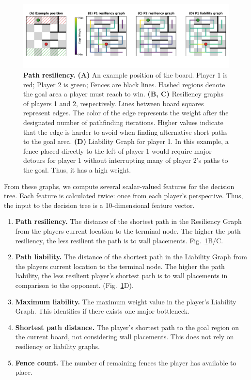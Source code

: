 \documentclass[10pt]{article}
\begin{document}
\begin{figure}[H]
    \centering
    \includegraphics[width=\linewidth]{path_figure.png}
    \caption{\textbf{Path resiliency.} \textbf{(A)} An example position of the board. Player 1 is red; Player 2 is green; Fences are black lines. Hashed regions denote the goal area a player must reach to win. \textbf{(B, C)} Resiliency graphs of players 1 and 2, respectively. Lines between board squares represent edges. The color of the edge represents the weight after the designated number of pathfinding iterations. Higher values indicate that the edge is harder to avoid when finding alternative short paths to the goal area. \textbf{(D)} Liability Graph for player 1. In this example, a fence placed directly to the left of player 1 would require major detours for player 1 without interrupting many of player 2's paths to the goal. Thus, it has a high weight.}
    \label{fig:resiliency}
\end{figure}


From these graphs, we compute several scalar-valued features for the decision tree. Each feature is calculated twice: once from each player's perspective. Thus, the input to the decision tree is a 10-dimensional feature vector. 

\begin{enumerate}
    \item \textbf{Path resiliency.} The distance of the shortest path in the Resiliency Graph from the players current location to the terminal node. The higher the path resiliency, the less resilient the path is to wall placements. Fig.~\ref{fig:resiliency}B/C.
    \item \textbf{Path liability.} The distance of the shortest path in the Liability Graph from the players current location to the terminal node. The higher the path liability, the less resilient player's shortest path is to wall placements in comparison to the opponent. (Fig.~\ref{fig:resiliency}D).
    \item \textbf{Maximum liability.} The maximum weight value in the player's Liability Graph. This identifies if there exists one major bottleneck.
    \item \textbf{Shortest path distance.} The player's shortest path to the goal region on the current board, not considering wall placements. This does not rely on resiliency or liability graphs.
    \item \textbf{Fence count.} The number of remaining fences the player has available to place.
\end{enumerate}
\end{document}
